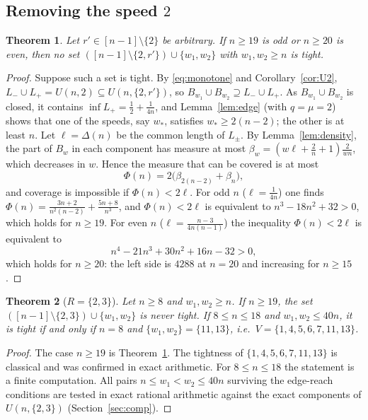 \documentclass[11pt]{article}
\newtheorem{theorem}{Theorem}[section]
\theoremstyle{definition}
\begin{document}
\subsection{\texorpdfstring{Removing the speed $2$}{Removing the speed 2}}

\begin{theorem}\label{thm:r2large}
Let $r'\in[n-1]\setminus\{2\}$ be arbitrary. If $n\ge19$ is odd or
$n\ge20$ is even, then no set $([n-1]\setminus\{2,r'\})\cup\{w_1,w_2\}$
with $w_1,w_2\ge n$ is tight.
\end{theorem}

\begin{proof}
Suppose such a set is tight. By \eqref{eq:monotone} and
Corollary~\ref{cor:U2}, $L_-\cup L_+=U(n,2)\subseteq U(n,\{2,r'\})$, so
$B_{w_1}\cup B_{w_2}\supseteq L_-\cup L_+$. As $B_{w_1}\cup B_{w_2}$ is
closed, it contains $\inf L_+=\frac12+\frac1{4n}$, and
Lemma~\ref{lem:edge} (with $q=\mu=2$) shows that one of the speeds, say
$w_*$, satisfies $w_*\ge2(n-2)$; the other is at least $n$. Let
$\ell=\Delta(n)$ be the common length of $L_\pm$. By
Lemma~\ref{lem:density}, the part of $B_w$ in each component has measure
at most $\beta_w=(w\ell+\frac2n+1)\frac2{wn}$, which decreases in $w$.
Hence the measure that can be covered is at most
\[
\Phi(n)=2\bigl(\beta_{2(n-2)}+\beta_n\bigr),
\]
and coverage is impossible if $\Phi(n)<2\ell$. For odd $n$
($\ell=\frac1{4n}$) one finds
$\Phi(n)=\frac{3n+2}{n^2(n-2)}+\frac{5n+8}{n^3}$, and $\Phi(n)<2\ell$
is equivalent to $n^3-18n^2+32>0$, which holds for $n\ge19$. For even
$n$ ($\ell=\frac{n-3}{4n(n-1)}$) the inequality $\Phi(n)<2\ell$ is
equivalent to
\[
n^4-21n^3+30n^2+16n-32>0,
\]
which holds for $n\ge20$: the left side is $4288$ at $n=20$ and
increasing for $n\ge15$.
\end{proof}

\begin{theorem}[$R=\{2,3\}$]\label{thm:r23}
Let $n\ge8$ and $w_1,w_2\ge n$. If $n\ge19$, the set
$([n-1]\setminus\{2,3\})\cup\{w_1,w_2\}$ is never tight. If
$8\le n\le18$ and $w_1,w_2\le40n$, it is tight if and only if $n=8$ and
$\{w_1,w_2\}=\{11,13\}$, i.e.\ $V=\{1,4,5,6,7,11,13\}$.
\end{theorem}

\begin{proof}
The case $n\ge19$ is Theorem~\ref{thm:r2large}. The tightness of
$\{1,4,5,6,7,11,13\}$ is classical \cite{GoddynWong2006} and was
confirmed in exact arithmetic. For $8\le n\le18$ the statement is a
finite computation. All pairs $n\le w_1<w_2\le40n$ surviving the
edge-reach conditions are tested in exact rational arithmetic against
the exact components of $U(n,\{2,3\})$ (Section~\ref{sec:comp}).
\end{proof}
\end{document}
